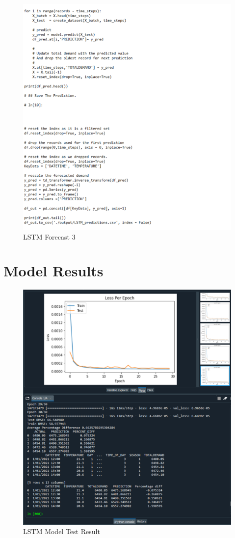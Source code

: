 \documentclass[mstat,12pt]{unswthesis}
\begin{document}
\begin{figure}[H]
\includegraphics{snapshots1/new LSTM_Forecast_3.png}
\caption{LSTM Forecast 3}\label{LSTMForecast3}
\end{figure}

\hypertarget{model-results}{%
\section*{\texorpdfstring{\textbf{Model
Results}}{Model Results}}\label{model-results}}

\begin{figure}[H]
\includegraphics{snapshots1/LSTM Test Result 1.png}
\caption{LSTM Model Test Result}\label{ModelResult}
\end{figure}
\end{document}
